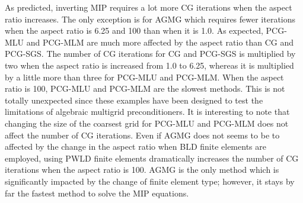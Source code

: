 As predicted, inverting MIP requires a lot more CG iterations when the aspect
ratio increases. The only exception is for AGMG which requires fewer iterations
when the aspect ratio is 6.25 and 100 than when it is 1.0. As expected, PCG-MLU and
PCG-MLM are much more affected by the aspect ratio than CG and PCG-SGS.
The number of CG iterations for CG and PCG-SGS is multiplied by two
when the aspect ratio is increased from 1.0 to 6.25, whereas it is multiplied by a 
little more than three for PCG-MLU and PCG-MLM. When the aspect ratio is 100, PCG-MLU 
and PCG-MLM are the slowest methods. This is not totally unexpected since these examples 
have been designed to test the limitations of algebraic multigrid preconditioners. It is 
interesting to note that changing the size of the coarsest grid for PCG-MLU and PCG-MLM 
does not affect the number of CG iterations. Even if AGMG does not seems to be to affected 
by the change in the aspect ratio when BLD finite elements are employed, using PWLD finite 
elements dramatically increases the number of CG iterations when the aspect ratio is 100. 
AGMG is the only method which is significantly impacted by the change of
finite element type; however, it stays by far the fastest method to solve the MIP equations.
